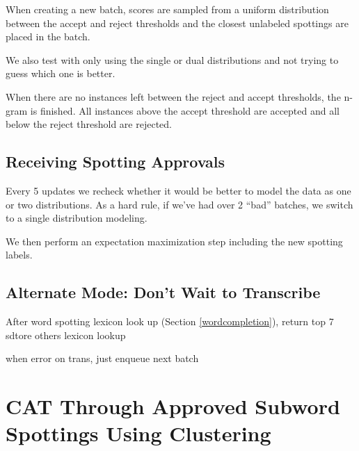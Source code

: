 \documentclass[ms,electronic,twosidetoc,letterpaper,chaptercenter,parttop,lof,lot]{byumsphd}
\begin{document}
When creating a new batch, scores are sampled from a uniform distribution between the accept and reject thresholds and the closest unlabeled spottings are placed in the batch.

We also test with only using the single or dual distributions and not trying to guess which one is better.

When there are no instances left between the reject and accept thresholds, the n-gram is finished. All instances above the accept threshold are accepted and all below the reject threshold are rejected.

%
%

\subsection{Receiving Spotting Approvals}

Every 5 updates we recheck whether it would be better to model the data as one or two distributions.
As a hard rule, if we've had over 2 ``bad'' batches, we switch to a single distribution modeling.

We then perform an expectation maximization step including the new spotting labels.




\subsection{Alternate Mode: Don't Wait to Transcribe}
After word spotting lexicon look up (Section \ref{wordcompletion}), return top 7
sdtore others
lexicon lookup

when error on trans, just enqueue next batch




\section{CAT Through Approved Subword Spottings Using Clustering}
\end{document}
